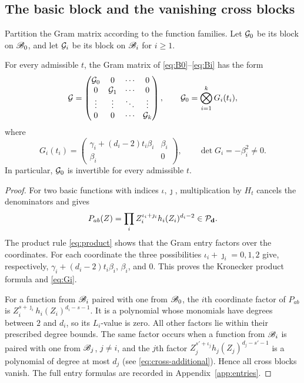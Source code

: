 \subsection{The basic block and the vanishing cross blocks}
Partition the Gram matrix according to the function families. Let
$\mathcal G_0$ be its block on $\mathscr B_0$, and let $\mathcal G_i$ be its block on
$\mathscr B_i$ for $i\ge1$.

\begin{lemma}\label{lem:blocks}
For every admissible $t$, the Gram matrix of
\eqref{eq:B0}--\eqref{eq:Bi} has the form
\begin{equation}\label{eq:block-diagonal}
\mathcal G=
\begin{pmatrix}
\mathcal G_0&0&\cdots&0\\
0&\mathcal G_1&\cdots&0\\
\vdots&\vdots&\ddots&\vdots\\
0&0&\cdots&\mathcal G_k
\end{pmatrix},
\qquad
\mathcal G_0=\bigotimes_{i=1}^k G_i(t_i),
\end{equation}
where
\begin{equation}\label{eq:Gi}
G_i(t_i)=
\begin{pmatrix}
\gamma_i+(d_i-2)t_i\beta_i&\beta_i\\
\beta_i&0
\end{pmatrix},
\qquad \det G_i=-\beta_i^2\ne0.
\end{equation}
In particular, $\mathcal G_0$ is invertible for every admissible $t$.
\end{lemma}
\begin{proof}
For two basic functions with indices $\iota,\jmath$, multiplication
by $H_t$ cancels the denominators and gives
\begin{equation}\label{eq:basic-product}
P_{ab}(Z)=\prod_i Z_i^{\iota_i+\jmath_i}h_i(Z_i)^{d_i-2}
\in\mathcal P_{\mathbf d}.
\end{equation}
The product rule \eqref{eq:product} shows that the Gram entry factors
over the coordinates. For each coordinate the three possibilities
$\iota_i+\jmath_i=0,1,2$ give, respectively,
$\gamma_i+(d_i-2)t_i\beta_i$, $\beta_i$, and $0$. This proves the
Kronecker product formula and \eqref{eq:Gi}.

For a function from $\mathscr B_i$ paired with one from $\mathscr B_0$, the
$i$th coordinate factor of $P_{ab}$ is
$Z_i^{s+\jmath_i}h_i(Z_i)^{d_i-s-1}$. It is a polynomial whose
monomials have degrees between $2$ and $d_i$, so its $L_i$-value
is zero. All other factors lie within their prescribed degree bounds.
The same factor occurs when a function from $\mathscr B_i$ is paired with
one from $\mathscr B_j$, $j\ne i$, and the $j$th factor
$Z_j^{s'+\iota_j}h_j(Z_j)^{d_j-s'-1}$ is a polynomial of degree at
most $d_j$ (see \eqref{eq:cross-additional}). Hence all cross blocks
vanish.
The full entry formulas are recorded in Appendix~\ref{app:entries}.
\end{proof}

